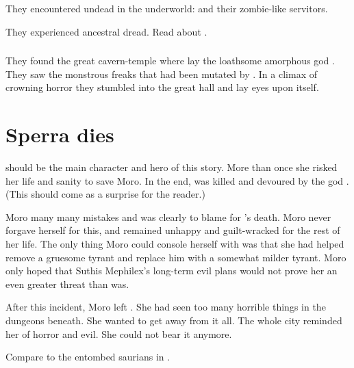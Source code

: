 They encountered undead in the underworld: 
 and their zombie-like servitors.

They experienced ancestral dread.
Read about .





\subsubsection{\Ubloth}
They found the great cavern-temple where lay the loathsome amorphous god \Ubloth. 
They saw the monstrous freaks that had been mutated by .
In a climax of crowning horror they stumbled into the great hall and lay eyes upon \Ubloth itself.









\section{Sperra dies}
\TulionSperra should be the main character and hero of this story.
More than once she risked her life and sanity to save Moro. 
In the end, \Sperra was killed and devoured by the god \Ubloth.
(This should come as a surprise for the reader.)

Moro many many mistakes and was clearly to blame for \Sperra's death.
Moro never forgave herself for this, and remained unhappy and guilt-wracked for the rest of her life. 
The only thing Moro could console herself with was that she had helped remove a gruesome tyrant and replace him with a somewhat milder tyrant. 
Moro only hoped that Suthis Mephilex's long-term evil plans would not prove her an even greater threat than \Uldraan was. 

After this incident, Moro left \Yormis. 
She had seen too many horrible things in the dungeons beneath. 
She wanted to get away from it all.
The whole city reminded her of horror and evil. 
She could not bear it anymore. 

Compare to the entombed saurians in \cite{Nile:InTheirDarkenesShrines}. 




























